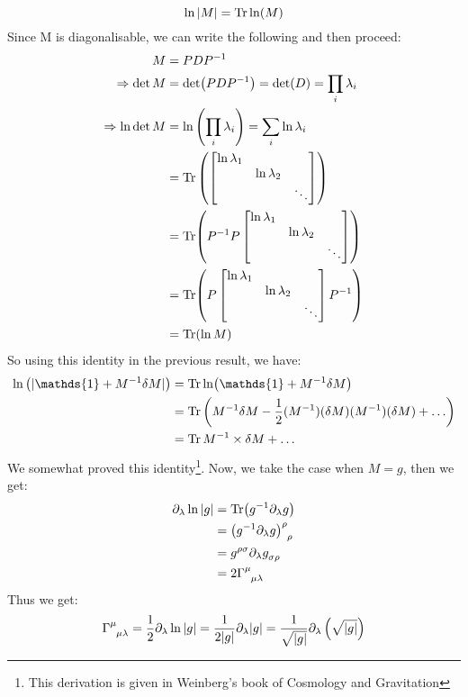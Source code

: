 $$\ln |M| = \Tr \ln (M)$$
Since M is diagonalisable, we can write the following and then proceed:
\begin{align*}
M &= P D P^{-1}  \\
\Rightarrow \det M &= \det(P D P^{-1}) = \det(D) = \prod_i \lambda_i \\
\Rightarrow \ln \det M &= \ln \left( \prod_i \lambda_i \right) = \sum_i \ln \lambda_i \\
&= \Tr \left( \begin{bmatrix}
\ln \lambda_1 & & \\
& \ln \lambda_2 & \\
& & \ddots
\end{bmatrix} \right) \\
&= \Tr(P^{-1} P \begin{bmatrix}
\ln \lambda_1 & & \\
& \ln \lambda_2 & \\
& & \ddots
\end{bmatrix}) \\
&= \Tr(P \begin{bmatrix}
\ln \lambda_1 & & \\
& \ln \lambda_2 & \\
& & \ddots
\end{bmatrix} P^{-1}) \\
&= \Tr(\ln M)
\end{align*}
So using this identity in the previous result, we have:
\begin{align*}
    \ln \brac{|\mathds{1}+  M^{-1}\delta M|} &= \Tr\ln (\mathds{1}+  M^{-1}\delta M)\\
    &= \Tr\brac{M^{-1}\delta M - \frac{1}{2}{(M^{-1})(\delta M)(M^{-1})(\delta M)}+\ldots}\\
    &=  \Tr M^{-1}\times \delta M  + \ldots
\end{align*}
We somewhat proved this identity\footnote{This derivation is given in Weinberg's book of Cosmology and Gravitation}. Now, we take the case when $M= g$, then we get:
\begin{align*}
   \partial_\lambda \ln |g| &=  \Tr(g^{-1}\partial_\lambda g) \\
&=\tensor{{\brac{g^{-1}\partial_\lambda g}}}{^\rho _\rho}\\
&= \tensor{{g}}{^\rho ^\sigma}\partial_\lambda \tensor{g}{_\sigma _\rho}\\
&=2\tensor{\Gamma}{^\mu _\mu _\lambda}
\end{align*}
Thus we get:
$$\tensor{\Gamma}{^\mu _\mu _\lambda} = \frac{1}{2}\partial_\lambda \ln |g|= \frac{1}{2|g|}\partial_\lambda |g|= \frac{1}{\sqrt{|g|}}\partial_\lambda \brac{\sqrt{|g|}}$$